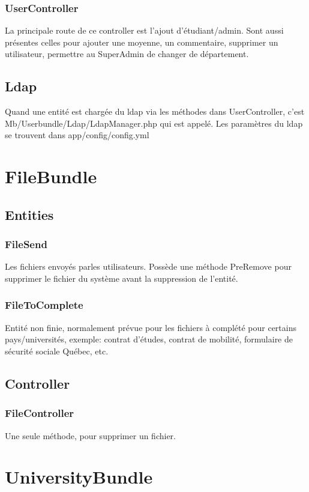 \subsubsection{UserController}
La principale route de ce controller est l'ajout d'étudiant/admin.
Sont aussi présentes celles pour ajouter une moyenne, un commentaire, supprimer un utilisateur, permettre au SuperAdmin de changer de département.


\subsection{Ldap}
Quand une entité est chargée du ldap via les méthodes dans UserController, c'est Mb/Userbundle/Ldap/LdapManager.php qui est appelé.
Les paramètres du ldap se trouvent dans app/config/config.yml


\section{FileBundle}
\subsection{Entities}
\subsubsection{FileSend}
Les fichiers envoyés parles utilisateurs. Possède une méthode PreRemove pour supprimer le fichier du système avant la suppression de l'entité.

\subsubsection{FileToComplete}
Entité non finie, normalement prévue pour les fichiers à complété pour certains pays/universités, exemple: contrat d'études, contrat de mobilité, formulaire de sécurité sociale Québec, etc.


\subsection{Controller}
\subsubsection{FileController}
Une seule méthode, pour supprimer un fichier.


\section{UniversityBundle}
